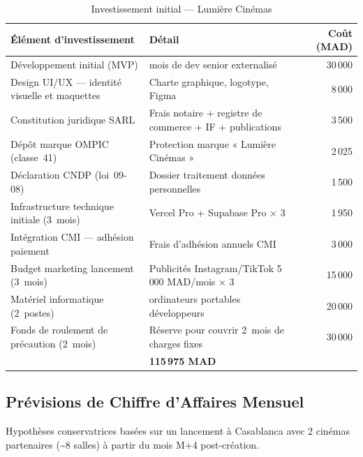 \documentclass[12pt,a4paper,openany]{report}
\begin{document}
\begin{table}[H]
\centering
\small
\renewcommand{\arraystretch}{1.25}
\begin{tabularx}{\textwidth}{%
  >{\raggedright\arraybackslash}p{5.2cm}%
  >{\raggedright\arraybackslash}X%
  r}
\toprule
\textbf{Élément d'investissement} & \textbf{Détail} & \textbf{Coût (MAD)} \\
\midrule
Développement initial (MVP) & 3 mois de dev senior externalisé & 30\,000 \\
Design UI/UX — identité visuelle et maquettes & Charte graphique, logotype, Figma & 8\,000 \\
Constitution juridique SARL & Frais notaire + registre de commerce + IF + publications & 3\,500 \\
Dépôt marque OMPIC (classe~41) & Protection marque « Lumière Cinémas » & 2\,025 \\
Déclaration CNDP (loi~09-08) & Dossier traitement données personnelles & 1\,500 \\
Infrastructure technique initiale (3~mois) & Vercel Pro + Supabase Pro × 3 & 1\,950 \\
Intégration CMI — adhésion paiement & Frais d'adhésion annuels CMI & 3\,000 \\
Budget marketing lancement (3~mois) & Publicités Instagram/TikTok 5\,000 MAD/mois × 3 & 15\,000 \\
Matériel informatique (2~postes) & 2 ordinateurs portables développeurs & 20\,000 \\
Fonds de roulement de précaution (2~mois) & Réserve pour couvrir 2~mois de charges fixes & 30\,000 \\
\midrule
\multicolumn{2}{r}{\textbf{TOTAL INVESTISSEMENT INITIAL}} & \textbf{115\,975 MAD} \\
\bottomrule
\end{tabularx}
\caption{Investissement initial — Lumière Cinémas}
\label{tab:invest}
\end{table}

\subsection{Prévisions de Chiffre d'Affaires Mensuel}

Hypothèses conservatrices basées sur un lancement à Casablanca avec 2 cinémas partenaires (\textasciitilde{}8 salles) à partir du mois M+4 post-création.
\end{document}
